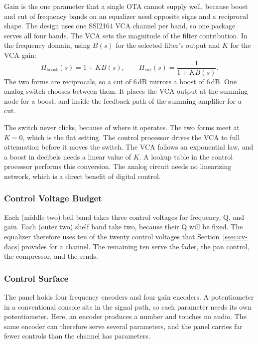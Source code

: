\documentclass[11pt, letterpaper,titlepage]{article}
\begin{document}
Gain is the one parameter that a single OTA cannot supply well, because boost
and cut of frequency bands on an equalizer need opposite signs and a reciprocal shape. The design uses one SSI2164
VCA channel per band, so one package serves all four bands. The VCA sets the
magnitude of the filter contribution. In the frequency domain, using $B(s)$ for the selected filter's
output and $K$ for the VCA gain:
%
\begin{equation}
    H_\mathrm{boost}(s) = 1 + K B(s) ,
    \qquad
    H_\mathrm{cut}(s) = \frac{1}{1 + K B(s)} .
    \label{eq:eq-gain}
\end{equation}
%
The two forms are reciprocals, so a cut of 6\,dB mirrors a boost of 6\,dB. One
analog switch chooses between them. It places the VCA output at the summing node
for a boost, and inside the feedback path of the summing amplifier for a cut.

The switch never clicks, because of where it operates. The two forms meet at
$K = 0$, which is the flat setting. The control processor drives the VCA to full
attenuation before it moves the switch. 
The VCA follows an exponential law, and a boost in decibels needs a linear value
of $K$. A lookup table in the control processor performs this conversion. The
analog circuit needs no linearizing network, which is a direct benefit of
digital control.

\subsubsection*{Control Voltage Budget}
\label{sssec:eq-cv}

Each (middle two) bell band takes three control voltages for frequency, Q, and gain. Each (outer two)
shelf band take two, because their Q will be fixed. The equalizer therefore uses ten
of the twenty control voltages that Section~\ref{ssec:cv-dacs} provides for a
channel. The remaining ten serve the fader, the pan control, the compressor, and
the sends.

\subsubsection*{Control Surface}
\label{sssec:eq-surface}

The panel holds four frequency encoders and four gain encoders. A potentiometer in a
conventional console sits in the signal path, so each parameter needs its own
potentiometer. Here, an encoder produces a number and touches no audio. The same encoder
can therefore serve several parameters, and the panel carries far fewer controls
than the channel has parameters.
\end{document}
